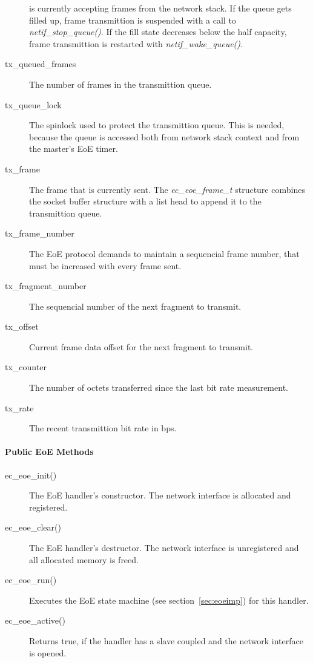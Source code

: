 \documentclass[a4paper,12pt,BCOR6mm,bibtotoc,idxtotoc]{scrbook}
\begin{document}
\begin{description}
  is currently accepting frames from the network stack. If the queue
  gets filled up, frame transmittion is suspended with a call to
  \textit{netif\_stop\_queue()}. If the fill state decreases below the
  half capacity, frame transmittion is restarted with
  \textit{netif\_wake\_queue()}.
\item[tx\_queued\_frames] The number of frames in the transmittion
  queue.
\item[tx\_queue\_lock] The spinlock used to protect the transmittion
  queue. This is needed, because the queue is accessed both from
  network stack context and from the master's EoE timer.
\item[tx\_frame] The frame that is currently sent. The
  \textit{ec\_eoe\_frame\_t} structure combines the socket buffer
  structure with a list head to append it to the transmittion queue.
\item[tx\_frame\_number] The EoE protocol demands to maintain a
  sequencial frame number, that must be increased with every frame
  sent.
\item[tx\_fragment\_number] The sequencial number of the next fragment
  to transmit.
\item[tx\_offset] Current frame data offset for the next fragment to
  transmit.
\item[tx\_counter] The number of octets transferred since the last bit
  rate measurement.
\item[tx\_rate] The recent transmittion bit rate in bps.
\end{description}

\paragraph{Public EoE Methods}

\begin{description}
\item[ec\_eoe\_init()] The EoE handler's constructor. The network
  interface is allocated and registered.
\item[ec\_eoe\_clear()] The EoE handler's destructor. The network
  interface is unregistered and all allocated memory is freed.
\item[ec\_eoe\_run()] Executes the EoE state machine (see
  section~\ref{sec:eoeimp}) for this handler.
\item[ec\_eoe\_active()] Returns true, if the handler has a slave
  coupled and the network interface is opened.
\end{description}
\end{document}
